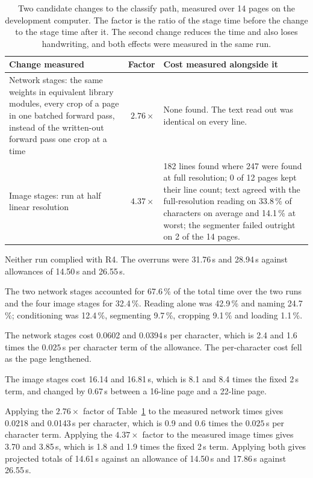 \begin{table}[h]
\centering
\fontsize{10}{12}\selectfont
\begin{tabular}{|p{4.6cm}|r|p{6.0cm}|}
\hline
\textbf{Change measured} & \textbf{Factor} & \textbf{Cost measured alongside it} \\
\hline
Network stages: the same weights in equivalent library modules, every crop of
a page in one batched forward pass, instead of the written-out forward pass one
crop at a time &
$2.76\times$ &
None found. The text read out was identical on every line. \\
\hline
Image stages: run at half linear resolution &
$4.37\times$ &
182 lines found where 247 were found at full resolution; 0 of 12 pages kept
their line count; text agreed with the full-resolution reading on 33.8\,\% of
characters on average and 14.1\,\% at worst; the segmenter failed outright on
2 of the 14 pages. \\
\hline
\end{tabular}
\caption{Two candidate changes to the classify path, measured over 14 pages on
the development computer. The factor is the ratio of the stage time before the
change to the stage time after it. The second change reduces the time and also
loses handwriting, and both effects were measured in the same run.}
\label{tab:res-r4-routes}
\end{table}

        \medskip

        Neither run complied with R4. The overruns were 31.76\,s and 28.94\,s
        against allowances of 14.50\,s and 26.55\,s.

        The two network stages accounted for 67.6\,\% of the total time over the
        two runs and the four image stages for 32.4\,\%. Reading alone was
        42.9\,\% and naming 24.7\,\%; conditioning was 12.4\,\%, segmenting
        9.7\,\%, cropping 9.1\,\% and loading 1.1\,\%.

        The network stages cost 0.0602 and 0.0394\,s per character, which is 2.4
        and 1.6 times the $0.025\,$s per character term of the allowance. The
        per-character cost fell as the page lengthened.

        The image stages cost 16.14 and 16.81\,s, which is 8.1 and 8.4 times the
        fixed 2\,s term, and changed by 0.67\,s between a 16-line page and a
        22-line page.

        Applying the $2.76\times$ factor of Table~\ref{tab:res-r4-routes} to the
        measured network times gives 0.0218 and 0.0143\,s per character, which
        is 0.9 and 0.6 times the $0.025\,$s per character term. Applying the
        $4.37\times$ factor to the measured image times gives 3.70 and 3.85\,s,
        which is 1.8 and 1.9 times the fixed 2\,s term. Applying both gives
        projected totals of 14.61\,s against an allowance of 14.50\,s and
        17.86\,s against 26.55\,s.


